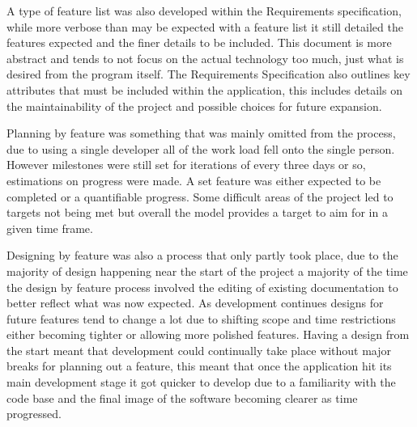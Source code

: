 A type of feature list was also developed within the Requirements specification, while more verbose than may be expected with a feature list it still detailed the features expected and the finer details to be included. This document is more abstract and tends to not focus on the actual technology too much, just what is desired from the program itself. The Requirements Specification also outlines key attributes that must be included within the application, this includes details on the maintainability of the project and possible choices for future expansion. 

Planning by feature was something that was mainly omitted from the process, due to using a single developer all of the work load fell onto the single person. However milestones were still set for iterations of every three days or so, estimations on progress were made. A set feature was either expected to be completed or a quantifiable progress. Some difficult areas of the project led to targets not being met but overall the model provides a target to aim for in a given time frame. 

Designing by feature was also a process that only partly took place, due to the majority of design happening near the start of the project a majority of the time the design by feature process involved the editing of existing documentation to better reflect what was now expected. As development continues designs for future features tend to change a lot due to shifting scope and time restrictions either becoming tighter or allowing more polished features. Having a design from the start meant that development could continually take place without major breaks for planning out a feature, this meant that once the application hit its main development stage it got quicker to develop due to a familiarity with the code base and the final image of the software becoming clearer as time progressed. 

